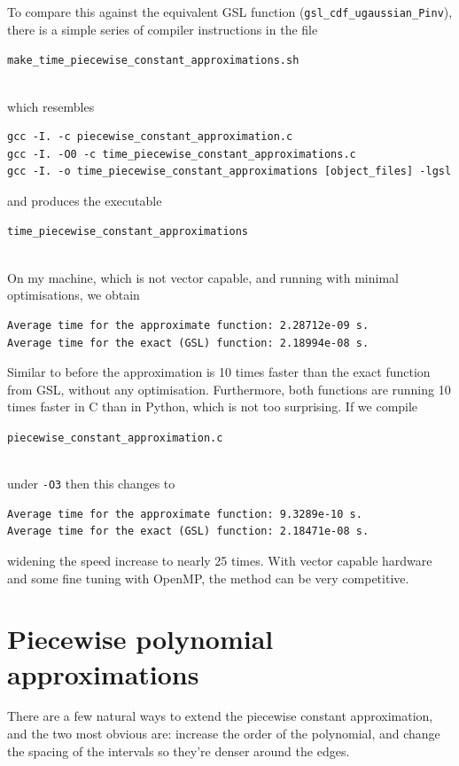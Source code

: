 \documentclass[11pt,a4paper,oneside,english]{extarticle}
\newcommand{\singlecodeline}[1]{\\[1em]\centerline{\lstinline[basicstyle=\ttfamily]$#1$}\\[1em]}
\begin{document}
To compare this against the equivalent GSL function (\verb|gsl_cdf_ugaussian_Pinv|), there is a simple series of compiler instructions in the file \singlecodeline{make_time_piecewise_constant_approximations.sh} which resembles 
\begin{verbatim}
gcc -I. -c piecewise_constant_approximation.c
gcc -I. -O0 -c time_piecewise_constant_approximations.c
gcc -I. -o time_piecewise_constant_approximations [object_files] -lgsl
\end{verbatim}
and produces the executable \singlecodeline{time_piecewise_constant_approximations}

On my machine, which is not vector capable, and running with minimal optimisations, we obtain
\begin{verbatim}
Average time for the approximate function: 2.28712e-09 s.
Average time for the exact (GSL) function: 2.18994e-08 s.
\end{verbatim}
Similar to before the approximation is 10 times faster than the exact function from GSL, without any optimisation. Furthermore, both functions are running 10 times faster in C than in Python, which is not too surprising. If we compile \singlecodeline{piecewise_constant_approximation.c}
under \verb|-O3| then this changes to 
\begin{verbatim}
Average time for the approximate function: 9.3289e-10 s.
Average time for the exact (GSL) function: 2.18471e-08 s.
\end{verbatim}
widening the speed increase to nearly 25 times. With vector capable hardware and some fine tuning with OpenMP, the method can be very competitive. 


\section{Piecewise polynomial approximations}


There are a few natural ways to extend the piecewise constant approximation, and the two most obvious are: increase the order of the polynomial, and change the spacing of the intervals so they're denser around the edges. 
\end{document}
